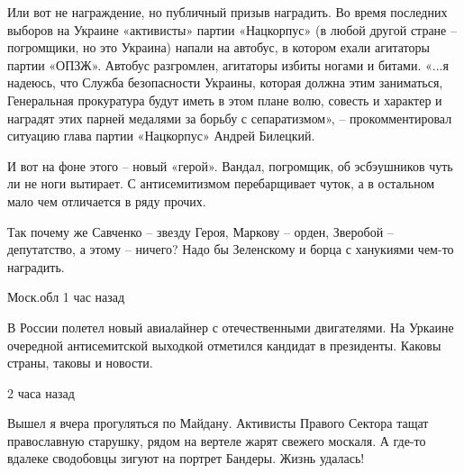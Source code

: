 Или вот не награждение, но публичный призыв наградить. Во время последних
выборов на Украине «активисты» партии «Нацкорпус» (в любой другой стране –
погромщики, но это Украина) напали на автобус, в котором ехали агитаторы партии
«ОПЗЖ». Автобус разгромлен, агитаторы избиты ногами и битами. «...я надеюсь,
что Служба безопасности Украины, которая должна этим заниматься, Генеральная
прокуратура будут иметь в этом плане волю, совесть и характер и наградят этих
парней медалями за борьбу с сепаратизмом», – прокомментировал ситуацию глава
партии «Нацкорпус» Андрей Билецкий.

И вот на фоне этого – новый «герой». Вандал, погромщик, об эсбэушников чуть ли
не ноги вытирает. С антисемитизмом перебарщивает чуток, а в остальном мало чем
отличается в ряду прочих.

Так почему же Савченко – звезду Героя, Маркову – орден, Зверобой – депутатство,
а этому – ничего? Надо бы Зеленскому и борца с ханукиями чем-то наградить. 

\begin{itemize}

 Моск.обл 1 час назад  

В России полетел новый авиалайнер с отечественными двигателями. На Уркаине
очередной антисемитской выходкой отметился кандидат в
президенты. Каковы страны, таковы и новости. 

 2 часа назад  

Вышел я вчера прогуляться по Майдану.  Активисты Правого Сектора тащат
православную старушку, рядом на вертеле жарят свежего москаля.
А где-то вдалеке сводобовцы зигуют на портрет Бандеры.  Жизнь
удалась!

\end{itemize}


